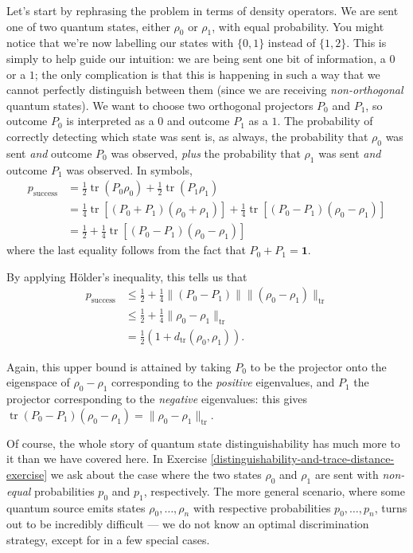 \documentclass[fleqn]{article}
\renewcommand{\footnote}[1]{\en{#1}}
\begin{document}
Let's start by rephrasing the problem in terms of density operators.
We are sent one of two quantum states, either \(\rho_0\) or \(\rho_1\), with equal probability.
You might notice that we're now labelling our states with \(\{0,1\}\) instead of \(\{1,2\}\).
This is simply to help guide our intuition: we are being sent one bit of information, a \(0\) or a \(1\); the only complication is that this is happening in such a way that we cannot perfectly distinguish between them (since we are receiving \emph{non-orthogonal} quantum states).
We want to choose two orthogonal projectors \(P_0\) and \(P_1\), so outcome \(P_0\) is interpreted as a \(0\) and outcome \(P_1\) as a \(1\).
The probability of correctly detecting which state was sent is, as always, the probability that \(\rho_0\) was sent \emph{and} outcome \(P_0\) was observed, \emph{plus} the probability that \(\rho_1\) was sent \emph{and} outcome \(P_1\) was observed.
In symbols,
\[
  \begin{aligned}
    p_{\mathrm{success}}
    &= \frac{1}{2}\operatorname{tr}(P_0\rho_0) + \frac{1}{2}\operatorname{tr}(P_1\rho_1)
  \\&= \frac{1}{4}\operatorname{tr}[(P_0+P_1)(\rho_0+\rho_1)] + \frac{1}{4}\operatorname{tr}[(P_0-P_1)(\rho_0-\rho_1)]
  \\&= \frac{1}{2} + \frac{1}{4}\operatorname{tr}[(P_0-P_1)(\rho_0-\rho_1)]
  \end{aligned}
\]
where the last equality follows from the fact that \(P_0+P_1=\mathbf{1}\).

By applying Hölder's inequality\footnote{See Section \ref{more-operator-norms}.}, this tells us that
\[
  \begin{aligned}
    p_{\mathrm{success}}
    &\leqslant\frac{1}{2} + \frac{1}{4}\|(P_0-P_1)\|\|(\rho_0-\rho_1)\|_{\operatorname{tr}}
  \\&\leqslant\frac{1}{2} + \frac{1}{4}\|\rho_0-\rho_1\|_{\operatorname{tr}}
  \\&= \frac{1}{2}(1+d_{\operatorname{tr}}(\rho_0,\rho_1)).
  \end{aligned}
\]

Again, this upper bound is attained by taking \(P_0\) to be the projector onto the eigenspace of \(\rho_0-\rho_1\) corresponding to the \emph{positive} eigenvalues, and \(P_1\) the projector corresponding to the \emph{negative} eigenvalues: this gives \(\operatorname{tr}(P_0-P_1)(\rho_0-\rho_1)=\|\rho_0-\rho_1\|_{\operatorname{tr}}\).

Of course, the whole story of quantum state distinguishability has much more to it than we have covered here.
In Exercise \ref{distinguishability-and-trace-distance-exercise} we ask about the case where the two states \(\rho_0\) and \(\rho_1\) are sent with \emph{non-equal} probabilities \(p_0\) and \(p_1\), respectively.
The more general scenario, where some quantum source emits states \(\rho_0,\ldots,\rho_n\) with respective probabilities \(p_0,\ldots,p_n\), turns out to be incredibly difficult --- we do not know an optimal discrimination strategy, except for in a few special cases.
\end{document}
